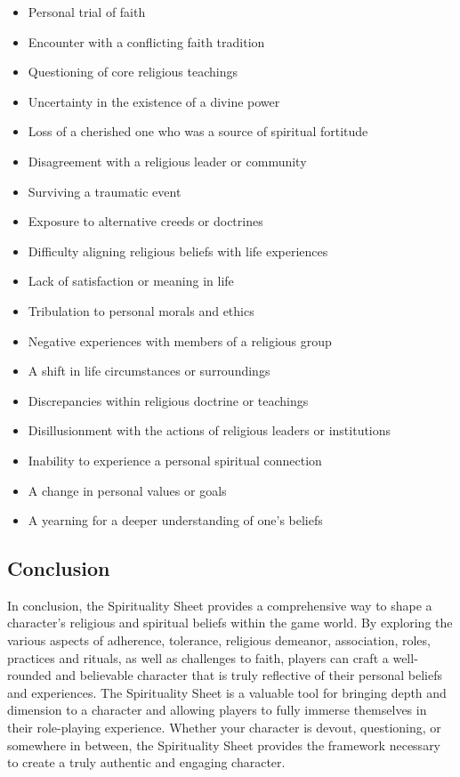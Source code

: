 \documentclass[12pt]{book}
\begin{document}
\begin{itemize}
    \item Personal trial of faith
    \item Encounter with a conflicting faith tradition
    \item Questioning of core religious teachings
    \item Uncertainty in the existence of a divine power
    \item Loss of a cherished one who was a source of spiritual fortitude
    \item Disagreement with a religious leader or community
    \item Surviving a traumatic event
    \item Exposure to alternative creeds or doctrines
    \item Difficulty aligning religious beliefs with life experiences
    \item Lack of satisfaction or meaning in life
    \item Tribulation to personal morals and ethics
    \item Negative experiences with members of a religious group
    \item A shift in life circumstances or surroundings
    \item Discrepancies within religious doctrine or teachings
    \item Disillusionment with the actions of religious leaders or institutions
    \item Inability to experience a personal spiritual connection
    \item A change in personal values or goals
    \item A yearning for a deeper understanding of one's beliefs
\end{itemize}

\subsection{\textbf{Conclusion}}

In conclusion, the Spirituality Sheet provides a comprehensive way to shape a character's religious and spiritual beliefs within the game world. By exploring the various aspects of adherence, tolerance, religious demeanor, association, roles, practices and rituals, as well as challenges to faith, players can craft a well-rounded and believable character that is truly reflective of their personal beliefs and experiences. The Spirituality Sheet is a valuable tool for bringing depth and dimension to a character and allowing players to fully immerse themselves in their role-playing experience. Whether your character is devout, questioning, or somewhere in between, the Spirituality Sheet provides the framework necessary to create a truly authentic and engaging character.
\end{document}
